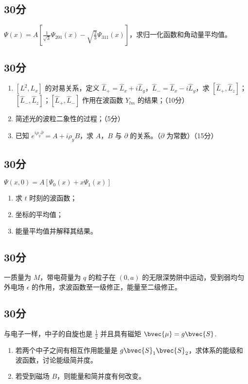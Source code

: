 
\subsection{30分}
$\displaystyle \varPsi (x)=A\left[\frac{1}{\sqrt{3}}\varPsi_{201}(x)-\sqrt{\frac{2}{3}}\varPsi_{311}(x)\right]$，求归一化函数和角动量平均值。
\subsection{30分}
\begin{enumerate}
\item $[L^{2},L_{x}]$ 的对易关系，定义 $\hat{L}_{+}=\hat{L}_{x}+i\hat{L}_{y}$，$\hat{L}_{-}=\hat{L}_{x}-i\hat{L}_{y}$，求 $[\hat{L}_{+},\hat{L}_{z}]$；$[\hat{L}_{-},\hat{L}_{z}]$；$[\hat{L}_{+},\hat{L}_{-}]$ 作用在波函数 $Y_{lm}$ 的结果；（10分）
\item 简述光的波粒二象性的过程；（5分）
\item 已知 $e^{i\rho_{y}\partial}=A+i\rho_{y}B$，求 $A$，$B$ 与 $\partial$ 的关系。（$\partial$ 为常数）（15分）
\end{enumerate}
\subsection{30分}
$\varPsi (x,0)=A[\varPsi_{0}(x)+x\varPsi_{1}(x)]$
\begin{enumerate}
\item 求 $t$ 时刻的波函数；
\item 坐标的平均值；
\item 能量平均值并解释其结果。
\end{enumerate}
\subsection{30分}
一质量为 $M$，带电荷量为 $q$ 的粒子在 $(0,a)$ 的无限深势阱中运动，受到弱均匀外电场 $\epsilon$ 的作用，求波函数至一级修正，能量至二级修正。
\subsection{30分}
与电子一样，中子的自旋也是 $\frac{1}{2}$ 并且具有磁矩 $\bvec{\mu}=g\bvec{S}$.
\begin{enumerate}
\item 若两个中子之间有相互作用能量是 $g\bvec{S}_{1}\bvec{S}_{2}$，求体系的能级和波函数，讨论能级简并度。
\item 若受到磁场 $B$，则能量和简并度有何改变。
\end{enumerate}